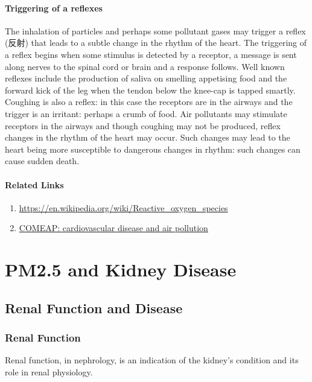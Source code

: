 \documentclass{article}
\begin{document}
\paragraph{Triggering of a reflexes} The inhalation of particles and perhaps some pollutant gases may trigger a reflex (反射) that leads to a subtle change in the rhythm of the heart. The triggering of a reflex begins when some stimulus is detected by a receptor, a message is sent along nerves to the spinal cord or brain and a response follows. Well known reflexes include the production of saliva on smelling appetising food and the forward kick of the leg when the tendon below the knee-cap is tapped smartly. Coughing is also a reflex: in this case the receptors are in the airways and the trigger is an irritant: perhaps a crumb of food. Air pollutants may stimulate receptors in the airways and though coughing may not be produced, reflex changes in the rhythm of the heart may occur. Such changes may lead to the heart being more susceptible to dangerous changes in rhythm: such changes can cause sudden death. 

\paragraph{Related Links}

\begin{enumerate}
    \item \url{https://en.wikipedia.org/wiki/Reactive_oxygen_species}
    \item \href{https://www.gov.uk/government/publications/comeap-cardiovascular-disease-and-air-pollution}{COMEAP: cardiovascular disease and air pollution}
\end{enumerate}

\section{PM2.5 and Kidney Disease}

\subsection{Renal Function and Disease}

\subsubsection{Renal Function}
Renal function, in nephrology, is an indication of the kidney's condition and its role in renal physiology. 
\end{document}
